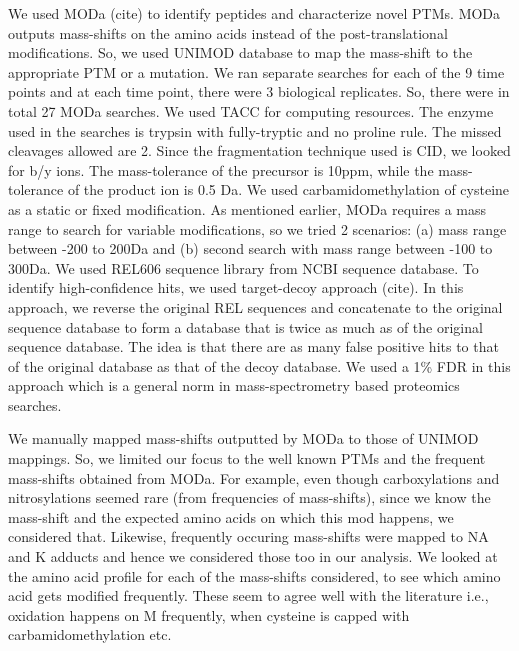 \documentclass[12pt]{article}
\begin{document}
We used MODa (cite) to identify peptides and characterize novel PTMs. MODa outputs mass-shifts on the amino acids instead of the post-translational modifications. So, we used UNIMOD database to map the mass-shift to the appropriate PTM or a mutation. We ran separate searches for each of the 9 time points and at each time point, there were 3 biological replicates. So, there were in total 27 MODa searches. We used TACC for computing resources. The enzyme used in the searches is trypsin with fully-tryptic and no proline rule. The missed cleavages allowed are 2. Since the fragmentation technique used is CID, we looked for b/y ions. The mass-tolerance of the precursor is 10ppm, while the mass-tolerance of the product ion is 0.5 Da. We used carbamidomethylation of cysteine as a static or fixed modification. As mentioned earlier, MODa requires a mass range to search for variable modifications, so we tried 2 scenarios: (a) mass range between -200 to 200Da and (b) second search with mass range between -100 to 300Da. We used REL606 sequence library from NCBI sequence database. To identify high-confidence hits, we used target-decoy approach (cite). In this approach, we reverse the original REL sequences and concatenate to the original sequence database to form a database that is twice as much as of the original sequence database. The idea is that there are as many false positive hits to that of the original database as that of the decoy database. We used a 1\% FDR in this approach which is a general norm in mass-spectrometry based proteomics searches.

We manually mapped mass-shifts outputted by MODa to those of UNIMOD mappings. So, we limited our focus to the well known PTMs and the frequent mass-shifts obtained from MODa. For example, even though carboxylations and nitrosylations seemed rare (from frequencies of mass-shifts), since we know the mass-shift and the expected amino acids on which this mod happens, we considered that. Likewise, frequently occuring mass-shifts were mapped to NA and K adducts and hence we considered those too in our analysis. We looked at the amino acid profile for each of the mass-shifts considered, to see which amino acid gets modified frequently. These seem to agree well with the literature i.e., oxidation happens on M frequently, when cysteine is capped with carbamidomethylation etc.



\end{document}

